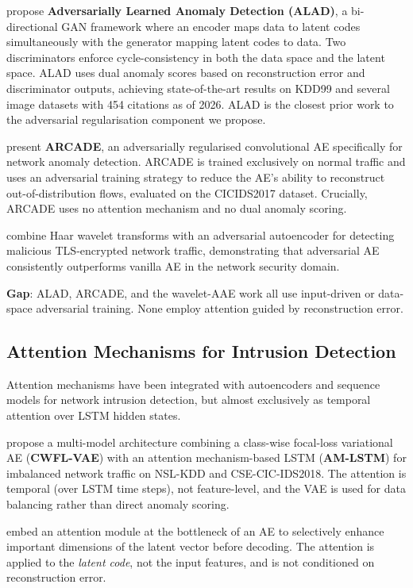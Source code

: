 \documentclass[12pt,a4paper]{article}
\begin{document}
\citet{alad} propose \textbf{Adversarially Learned Anomaly Detection (ALAD)},
a bi-directional GAN framework where an encoder maps data to latent codes
simultaneously with the generator mapping latent codes to data. Two discriminators
enforce cycle-consistency in both the data space and the latent space. ALAD uses
dual anomaly scores based on reconstruction error and discriminator outputs,
achieving state-of-the-art results on KDD99 and several image datasets with
454 citations as of 2026. ALAD is the closest prior work to the adversarial
regularisation component we propose.

\citet{arcade} present \textbf{ARCADE}, an adversarially regularised convolutional
AE specifically for network anomaly detection. ARCADE is trained exclusively on
normal traffic and uses an adversarial training strategy to reduce the AE's
ability to reconstruct out-of-distribution flows, evaluated on the CICIDS2017
dataset. Crucially, ARCADE uses no attention mechanism and no dual anomaly
scoring.

\citet{wavelet_aae} combine Haar wavelet transforms with an adversarial
autoencoder for detecting malicious TLS-encrypted network traffic, demonstrating
that adversarial AE consistently outperforms vanilla AE in the network security
domain.

\textbf{Gap}: ALAD, ARCADE, and the wavelet-AAE work all use input-driven or
data-space adversarial training. None employ attention guided by reconstruction
error.

\subsection{Attention Mechanisms for Intrusion Detection}

Attention mechanisms have been integrated with autoencoders and sequence models
for network intrusion detection, but almost exclusively as temporal attention
over LSTM hidden states.

\citet{vae_attention_lstm} propose a multi-model architecture combining a
class-wise focal-loss variational AE (\textbf{CWFL-VAE}) with an attention
mechanism-based LSTM (\textbf{AM-LSTM}) for imbalanced network traffic on
NSL-KDD and CSE-CIC-IDS2018. The attention is temporal (over LSTM time steps),
not feature-level, and the VAE is used for data balancing rather than direct
anomaly scoring.

\citet{attention_ae_latent} embed an attention module at the bottleneck of an
AE to selectively enhance important dimensions of the latent vector before
decoding. The attention is applied to the \emph{latent code}, not the input
features, and is not conditioned on reconstruction error.
\end{document}
